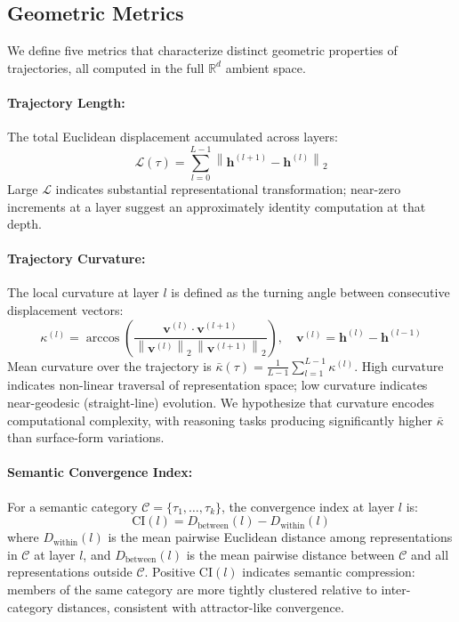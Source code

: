 \documentclass{article}
\begin{document}
\subsection{Geometric Metrics}
\label{subsec:metrics}

We define five metrics that characterize distinct geometric properties of trajectories, all computed in the full $\mathbb{R}^d$ ambient space.

\paragraph{Trajectory Length:} The total Euclidean displacement accumulated across layers:
\begin{equation}
    \mathcal{L}(\tau) = \sum_{l=0}^{L-1} 
    \left\lVert \mathbf{h}^{(l+1)} - \mathbf{h}^{(l)} \right\rVert_2
\end{equation}
Large $\mathcal{L}$ indicates substantial representational transformation; near-zero increments at a layer suggest an approximately identity computation at that depth.

\paragraph{Trajectory Curvature:} The local curvature at layer $l$ is defined as the turning angle between consecutive displacement vectors:
\begin{equation}
    \kappa^{(l)} = \arccos\!\left(
        \frac{\mathbf{v}^{(l)} \cdot \mathbf{v}^{(l+1)}}
             {\left\lVert\mathbf{v}^{(l)}\right\rVert_2 \,
              \left\lVert\mathbf{v}^{(l+1)}\right\rVert_2}
    \right), \quad
    \mathbf{v}^{(l)} = \mathbf{h}^{(l)} - \mathbf{h}^{(l-1)}
\end{equation}
Mean curvature over the trajectory is $\bar{\kappa}(\tau) = 
\frac{1}{L-1}\sum_{l=1}^{L-1} \kappa^{(l)}$. High curvature indicates non-linear traversal of representation space; low curvature indicates near-geodesic (straight-line) evolution. We hypothesize that curvature encodes computational complexity, with reasoning tasks producing significantly higher $\bar{\kappa}$ than surface-form variations.

\paragraph{Semantic Convergence Index:} For a semantic category $\mathcal{C} = \{\tau_1, \dots, \tau_k\}$, the convergence index at layer $l$ is:
\begin{equation}
    \text{CI}(l) = D_{\text{between}}(l) - D_{\text{within}}(l)
\end{equation}
where $D_{\text{within}}(l)$ is the mean pairwise Euclidean distance among representations in $\mathcal{C}$ at layer $l$, and $D_{\text{between}}(l)$ is the mean pairwise distance between $\mathcal{C}$ and all representations outside $\mathcal{C}$. Positive $\text{CI}(l)$ indicates semantic compression: members of the same category are more tightly clustered relative to inter-category distances, consistent with attractor-like convergence.
\end{document}
